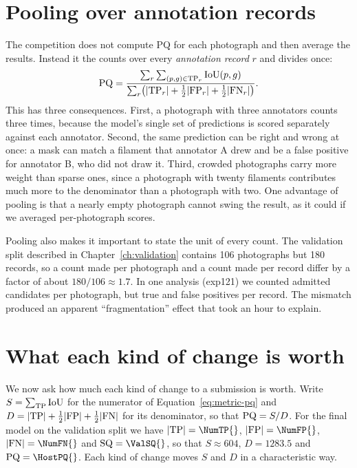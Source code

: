 \section{Pooling over annotation records}\label{sec:metric-pooling}
The competition does not compute PQ for each photograph and then average the results. Instead it
 the counts over every \emph{annotation record} $r$ and divides once:
\begin{equation}
\mathrm{PQ}=\frac{\sum_r\sum_{(p,g)\in\mathrm{TP}_r}\mathrm{IoU}(p,g)}{\sum_r\bigl(|\mathrm{TP}_r|+\tfrac12|\mathrm{FP}_r|+\tfrac12|\mathrm{FN}_r|\bigr)}.
\label{eq:metric-pooled}
\end{equation}
This has three consequences. First, a photograph with three annotators counts three times, because
the model's single set of predictions is scored separately against each annotator. Second, the
same prediction can be right and wrong at once: a mask can match a filament that annotator A drew
and be a false positive for annotator B, who did not draw it. Third, crowded photographs carry more
weight than sparse ones, since a photograph with twenty filaments contributes much more to the
denominator than a photograph with two. One advantage of pooling is that a nearly empty photograph
cannot swing the result, as it could if we averaged per-photograph scores.

Pooling also makes it important to state the unit of every count. The validation split described
in Chapter~\ref{ch:validation} contains 106 photographs but 180 records, so a count made per
photograph and a count made per record differ by a factor of about $180/106\approx1.7$. In one
analysis (exp121) we counted admitted candidates per photograph, but true and false positives per
record. The mismatch produced an apparent ``fragmentation'' effect that took an hour to explain.

\section{What each kind of change is worth}\label{sec:metric-leverage}
We now ask how much each kind of change to a submission is worth. Write $S=\sum_{\mathrm{TP}}\mathrm{IoU}$ for the
numerator of Equation~\eqref{eq:metric-pq} and $D=|\mathrm{TP}|+\frac12|\mathrm{FP}|+\frac12|\mathrm{FN}|$ for its
denominator, so that $\mathrm{PQ}=S/D$. For the final model on the validation split we have
$|\TP|=\NumTP{}$, $|\FP|=\NumFP{}$, $|\FN|=\NumFN{}$ and $\SQ=\ValSQ{}$, so that $S\approx604$,
$D=1283.5$ and $\PQ=\HostPQ{}$. Each kind of change moves $S$ and $D$ in a characteristic way.


